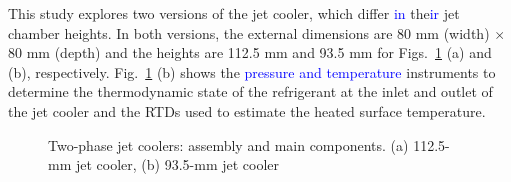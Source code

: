 \documentclass[review,preprint,12pt]{elsarticle}
\begin{document}
This study explores two versions of the jet cooler, which differ \textcolor{blue}{in} the\textcolor{blue}{ir} jet chamber heights. In both versions, the external dimensions are 80 mm (width) $\times$ 80 mm (depth) and the heights are 112.5 mm and 93.5 mm for Figs.~\ref{fig:Figure_2} (a) and (b), respectively. Fig.~\ref{fig:Figure_2} (b) shows the \textcolor{blue}{pressure and temperature} instruments to determine the thermodynamic state of the refrigerant at the inlet and outlet of the jet cooler and the RTDs used to estimate the heated surface temperature.

%

\begin{figure}[!h]
\centering
{}
\hfil
{}
\caption{Two-phase jet coolers: assembly and main components. (a) 112.5-mm jet cooler, (b) 93.5-mm jet cooler}
\label{fig:Figure_2}
\end{figure} 
\end{document}
